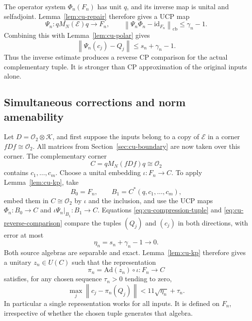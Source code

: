 The operator system $\Phi_n(F_n)$ has unit $q$, and its inverse map is
unital and selfadjoint. Lemma~\ref{lem:cu-repair} therefore gives a UCP map 
\begin{equation*}
\Psi_n:qM_N(\mathcal{E})q\longrightarrow F_n,\qquad \left\|\Psi_n\Phi_n-\mathrm{id}_{F_n}\right\|_{\mathrm{cb}}\leq\gamma_n-1.
\end{equation*}
Combining this with Lemma~\ref{lem:cu-polar} gives 
\begin{equation}  \label{eq:cu-reverse-comparison}
\left\|\Psi_n(c_j)-Q_j\right\|\leq s_n+\gamma_n-1.
\end{equation}
Thus the inverse estimate produces a reverse CP comparison for the actual
complementary tuple. It is stronger than CP approximation of the original
inputs alone.


\subsection{Simultaneous corrections and norm amenability}

\label{sec:cu-norm}

Let $D=\mathcal{O}_2\otimes\mathcal{K}$, and first suppose the inputs belong
to a copy of $\mathcal{E}$ in a corner $fDf\cong\mathcal{O}_2$. All matrices
from Section~\ref{sec:cu-boundary} are now taken over this corner. The
complementary corner 
\begin{equation*}
C=qM_N(fDf)q\cong\mathcal{O}_2
\end{equation*}
contains $c_1,\ldots,c_m$. Choose a unital embedding $\iota:F_n\to C$. To
apply Lemma~\ref{lem:cu-kp}, take 
\begin{equation*}
B_0=F_n,\qquad B_1=C^*(q,c_1,\ldots,c_m),
\end{equation*}
embed them in $C\cong\mathcal{O}_2$ by $\iota$ and the inclusion, and use
the UCP maps $\Phi_n:B_0\to C$ and $\iota\Psi_n|_{B_1}:B_1\to C$. Equations \eqref{eq:cu-compression-tuple} and \eqref{eq:cu-reverse-comparison} compare the
tuples $(Q_j)$ and $(c_j)$ in both directions, with error at most 
\begin{equation*}
\eta_n=s_n+\gamma_n-1\longrightarrow0.
\end{equation*}
Both source algebras are separable and exact. Lemma~\ref{lem:cu-kp} therefore
gives a unitary $z_n\in U(C)$ such that the representation 
\begin{equation*}
\pi_n=\mathrm{Ad}(z_n)\circ\iota:F_n\to C
\end{equation*}
satisfies, for any chosen sequence $\tau_n>0$ tending to zero, 
\begin{equation}  \label{eq:cu-one-representation}
\max_j\left\|c_j-\pi_n(Q_j)\right\|<11\sqrt{\eta_n}+\tau_n.
\end{equation}
In particular a single representation works for all inputs. It is defined on 
$F_n$, irrespective of whether the chosen tuple generates that algebra.

